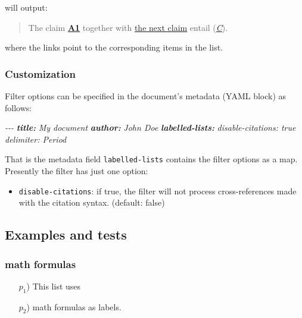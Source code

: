 \documentclass[
]{article}
\newenvironment{Shaded}{}{}
\newcommand{\AnnotationTok}[1]{\textcolor[rgb]{0.38,0.63,0.69}{\textbf{\textit{#1}}}}
\newcommand{\CommentTok}[1]{\textcolor[rgb]{0.38,0.63,0.69}{\textit{#1}}}
\providecommand{\tightlist}{%
  \setlength{\itemsep}{0pt}\setlength{\parskip}{0pt}}
\begin{document}
will output:

\begin{quote}
The claim \href{}{\textbf{A1}} together with \href{}{the next claim}
entail (\href{}{\emph{C}}).
\end{quote}

where the links point to the corresponding items in the list.

\hypertarget{customization}{%
\subsubsection{Customization}\label{customization}}

Filter options can be specified in the document's metadata (YAML block)
as follows:

\begin{Shaded}
\begin{Highlighting}[]
\CommentTok{{-}{-}{-}}
\AnnotationTok{title:}\CommentTok{ My document}
\AnnotationTok{author:}\CommentTok{ John Doe}
\AnnotationTok{labelled{-}lists:}
\CommentTok{  disable{-}citations: true}
\CommentTok{  delimiter: Period}
\end{Highlighting}
\end{Shaded}

That is the metadata field \texttt{labelled-lists} contains the filter
options as a map. Presently the filter has just one option:

\begin{itemize}
\tightlist
\item
  \texttt{disable-citations}: if true, the filter will not process
  cross-references made with the citation syntax. (default: false)
\end{itemize}

\hypertarget{examples-and-tests}{%
\subsection{Examples and tests}\label{examples-and-tests}}

\hypertarget{math-formulas}{%
\subsubsection{math formulas}\label{math-formulas}}

\begin{itemize}
\tightlist

\item[\(p_1\))] This list uses

\item[\(p_2\))] math formulas as labels.

\end{itemize}
\end{document}
